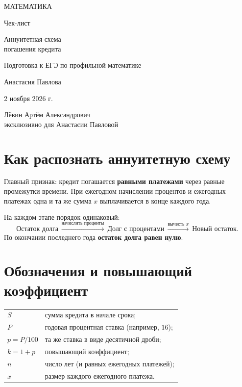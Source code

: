 \documentclass[a4paper,12pt]{article}
\newcommand{\focus}[1]{\textcolor{darkaccent}{#1}}
\begin{document}
\thispagestyle{empty}
\begin{center}
\vspace*{23mm}
{\large\color{darkaccent} МАТЕМАТИКА}\par
\vspace{13mm}
{\LARGE Чек-лист}\par
\vspace{9mm}
{\LARGE\color{accent} Аннуитетная схема\\[3pt] погашения кредита}\par
\vspace{14mm}
{\normalsize Подготовка к ЕГЭ по профильной математике}\par
\vfill
{\large Анастасия Павлова}\par
\vspace{12mm}
{\normalsize 2 ноября 2026 г.}\par
\vspace{17mm}
{\small Лёвин Артём Александрович\\эксклюзивно для Анастасии Павловой}\par
\vspace{15mm}
\vspace*{6mm}
\end{center}
\clearpage

\section{Как распознать аннуитетную схему}
\focus{Главный признак:} кредит погашается \textbf{равными платежами} через равные промежутки времени. При ежегодном начислении процентов и ежегодных платежах одна и та же сумма \(x\) выплачивается в конце каждого года.

На каждом этапе порядок одинаковый:
\[
\boxed{\text{Остаток долга}}
\ \xrightarrow{\text{начислить проценты}}\
\boxed{\text{Долг с процентами}}
\ \xrightarrow{\text{вычесть }x}\
\boxed{\text{Новый остаток}}.
\]
По окончании последнего года \textbf{остаток долга равен нулю}.

\section{Обозначения и повышающий коэффициент}
\begin{tabularx}{\linewidth}{@{}p{27mm}X@{}}
\toprule
\(S\) & сумма кредита в начале срока; \\
\(P\) & годовая процентная ставка (например, \(16\)); \\
\(p=P/100\) & та же ставка в виде десятичной дроби; \\
\(k=1+p\) & повышающий коэффициент; \\
\(n\) & число лет (и равных ежегодных платежей); \\
\(x\) & размер каждого ежегодного платежа. \\
\bottomrule
\end{tabularx}
\end{document}
